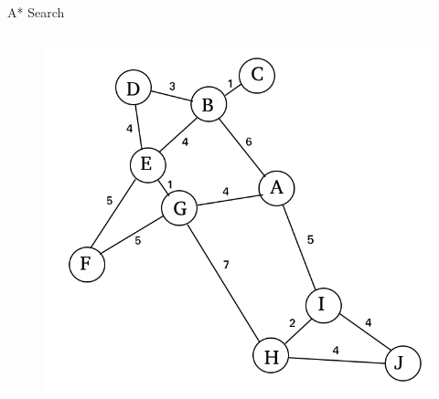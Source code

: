 \documentclass{beamer}
\begin{document}
\begin{frame}{A* Search}
	\begin{columns}[T]
		\begin{column}{.48\textwidth}
			\begin{figure}
			\centering
				\includegraphics[width=1.3\linewidth]{example_weights.jpg}
			\end{figure}
		\end{column}
		

\end{columns}
\end{frame}
\end{document}
